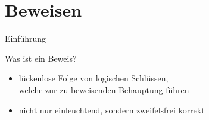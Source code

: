 \documentclass[10pt]{beamer}
\begin{document}
\section{Beweisen}

\begin{frame}{Einführung}
\begin{alertblock}{Was ist ein Beweis?}
\begin{itemize}
        \item lückenlose Folge von logischen Schlüssen,\\welche zur zu beweisenden Behauptung führen
        \item nicht nur einleuchtend, sondern zweifelsfrei korrekt
    \end{itemize}
\end{alertblock}
\end{frame}
\end{document}
